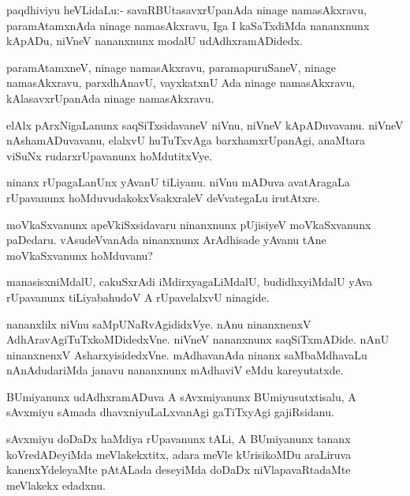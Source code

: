 \documentclass{article}
\begin{document}
\begin{mn}
paqdhiviyu heVLidaLu:- savaRBUtasavxrUpanAda ninage namasAkxravu,
paramAtamxnAda ninage namasAkxravu, Iga I kaSaTxdiMda nananxnunx
kApADu, niVneV nananxnunx modalU udAdhxramADidedx.
\end{mn}

\begin{mn}%
paramAtamxneV, ninage namasAkxravu, paramapuruSaneV, ninage
namasAkxravu, parxdhAnavU, vayxkatxnU Ada ninage namasAkxravu,
kAlasavxrUpanAda ninage namasAkxravu.
\end{mn}

\begin{mn}%
elAlx pArxNigaLanunx saqSiTxsidavaneV niVnu, niVneV
kApADuvavanu. niVneV nAshamADuvavanu, elalxvU huTuTxvAga
barxhamxrUpanAgi, anaMtara viSuNx rudarxrUpavanunx hoMdutitxVye.
\end{mn}

\begin{mn}
ninanx rUpagaLanUnx yAvanU tiLiyanu. niVnu mADuva avatAragaLa
rUpavanunx hoMduvudakokxVsakxraleV deVvategaLu irutAtxre.
\end{mn}

\begin{mn}%
moVkaSxvanunx apeVkiSxsidavaru ninanxnunx pUjisiyeV moVkaSxvanunx
paDedaru. vAsudeVvanAda ninanxnunx ArAdhisade yAvanu tAne
moVkaSxvanunx hoMduvanu?
\end{mn}

\begin{mn}
manasisxniMdalU, cakuSxrAdi iMdirxyagaLiMdalU, budidhxyiMdalU yAva
rUpavanunx tiLiyabahudoV A rUpavelalxvU ninagide.
\end{mn}

\begin{mn}
nananxlilx niVnu saMpUNaRvAgididxVye. nAnu ninanxnenxV
AdhAravAgiTuTxkoMDidedxVne. niVneV nananxnunx saqSiTxmADide. nAnU
ninanxnenxV AsharxyisidedxVne. mAdhavanAda ninanx saMbaMdhavaLu
nAnAdudariMda janavu nananxnunx mAdhaviV eMdu kareyutatxde.
\end{mn}

\begin{mn}%
BUmiyanunx udAdhxramADuva A sAvxmiyanunx BUmiyusutxtisalu, A sAvxmiyu
sAmada dhavxniyuLaLxvanAgi gaTiTxyAgi gajiRsidanu.
\end{mn}

\begin{mn}
sAvxmiyu doDaDx haMdiya rUpavanunx tALi, A BUmiyanunx tananx
koVredADeyiMda meVlakekxtitx, adara meVle kUrisikoMDu araLiruva
kanenxYdeleyaMte pAtALada deseyiMda doDaDx niVlapavaRtadaMte meVlakekx edadxnu.
\end{mn}
\end{document}

